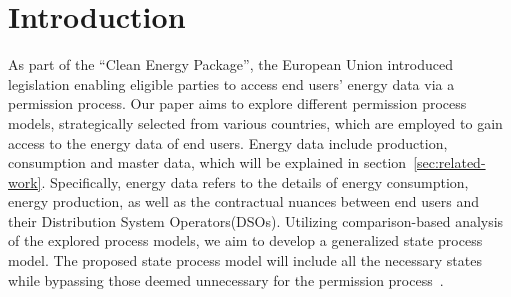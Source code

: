 \section{Introduction}\label{sec:introduction}
As part of the ``Clean Energy Package'', the European Union introduced legislation enabling eligible parties to access end users' energy data via a permission process.
Our paper aims to explore different permission process models, strategically selected from various countries, which are employed to gain access to the energy data of end users.
Energy data include production, consumption and master data, which will be explained in section\ \ref{sec:related-work}.
Specifically, energy data refers to the details of energy consumption, energy production, as well as the contractual nuances between end users and their Distribution System Operators(DSOs).
Utilizing comparison-based analysis of the explored process models, we aim to develop a generalized state process model.
The proposed state process model will include all the necessary states while bypassing those deemed unnecessary for the permission process~\cite{clean-energy}.